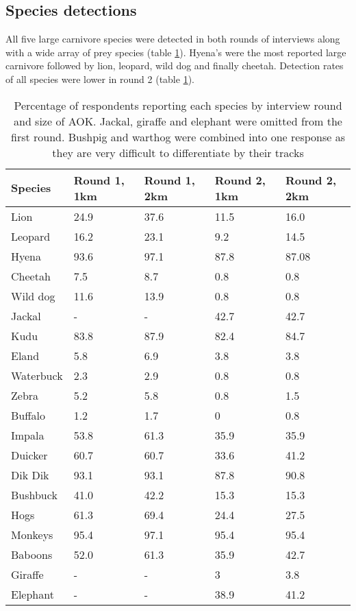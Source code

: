 \subsection{Species detections}

All five large carnivore species were detected in both rounds of interviews along with a wide array of prey species (table \ref{table:species_detections}). Hyena's were the most reported large carnivore followed by lion, leopard, wild dog and finally cheetah. Detection rates of all species were lower in round 2 (table \ref{table:species_detections}).

\begin{table}[h]
	\small
	\begin{center}
		\begin{tabular}{l l l l l}
			\hline \hline		
			Species	& Round 1, 1km 	& Round 1, 2km 	& Round 2, 1km 	& Round 2, 2km \\ \hline
			Lion		& 24.9			&	37.6			&	11.5			& 16.0\\	
			Leopard	& 16.2			&	23.1			&	9.2			& 14.5\\
			Hyena	& 93.6			&	97.1			&	87.8			& 87.08\\
			Cheetah	& 7.5			&	8.7			&	0.8			& 0.8\\
			Wild dog	& 11.6			&	13.9			&	0.8			& 0.8\\	
			Jackal\textdagger	& -				&	-			&	42.7			& 42.7\\	
			Kudu		&83.8			&	87.9			&	82.4			& 84.7\\	
			Eland	&5.8				&	6.9			&	3.8			& 3.8\\	
			Waterbuck&2.3			&	2.9			&	0.8			& 0.8\\	
			Zebra	&5.2				&	5.8			&	0.8			& 1.5\\	
			Buffalo	&1.2				&	1.7			&	0			& 0.8\\	
			Impala	&53.8			&	61.3			&35.9			& 35.9\\	
			Duicker	&60.7			&	60.7			&33.6			& 41.2\\	
			Dik Dik	&93.1			&	93.1			&87.8			& 90.8\\	
			Bushbuck	&41.0			&	42.2			&15.3			& 15.3\\	
			Hogs	\textdaggerdbl	&61.3			&	69.4			&24.4			& 27.5\\	
			Monkeys	&95.4			&	97.1			&95.4			& 95.4\\
			Baboons	&52.0			&	61.3			&35.9			& 42.7\\	
			Giraffe\textdagger	&-				&	-			&	3			& 3.8\\	
			Elephant\textdagger&-				& 	-			&38.9			& 41.2\\					
			\hline \hline						
		\end{tabular}
		\caption{Percentage of respondents reporting each species by interview round and size of AOK. \textdagger Jackal, giraffe and elephant were omitted from the first round. \textdaggerdbl Bushpig and warthog were combined into one response as they are very difficult to differentiate by their tracks}
	\label{table:species_detections}
	\end{center}
\end{table}

